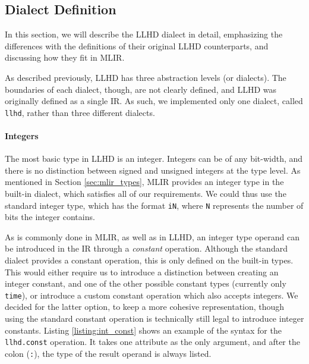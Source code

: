 

\subsection{Dialect Definition}
In this section, we will describe the LLHD dialect in detail, emphasizing the differences with the definitions of their original LLHD counterparts, and discussing how they fit in MLIR.

As described previously, LLHD has three abstraction levels (or dialects). The boundaries of each dialect, though, are not clearly defined, and LLHD was originally defined as a single IR. As such, we implemented only one dialect, called \texttt{llhd}, rather than three different dialects.

\paragraph{Integers}
The most basic type in LLHD is an integer. Integers can be of any bit-width, and there is no distinction between signed and unsigned integers at the type level. As mentioned in Section \ref{sec:mlir_types}, MLIR provides an integer type in the built-in dialect, which satisfies all of our requirements. We could thus use the standard integer type, which has the format \texttt{iN}, where \texttt{N} represents the number of bits the integer contains.

As is commonly done in MLIR, as well as in LLHD, an integer type operand can be introduced in the IR through a \textit{constant} operation. Although the standard dialect provides a constant operation, this is only defined on the built-in types. This would either require us to introduce a distinction between creating an integer constant, and one of the other possible constant types (currently only \texttt{time}), or introduce a custom constant operation which also accepts integers. We decided for the latter option, to keep a more cohesive representation, though using the standard constant operation is technically still legal to introduce integer constants. Listing \ref{listing:int_const} shows an example of the syntax for the \texttt{llhd.const} operation. It takes one attribute as the only argument, and after the colon (\texttt{:}), the type of the result operand is always listed.

